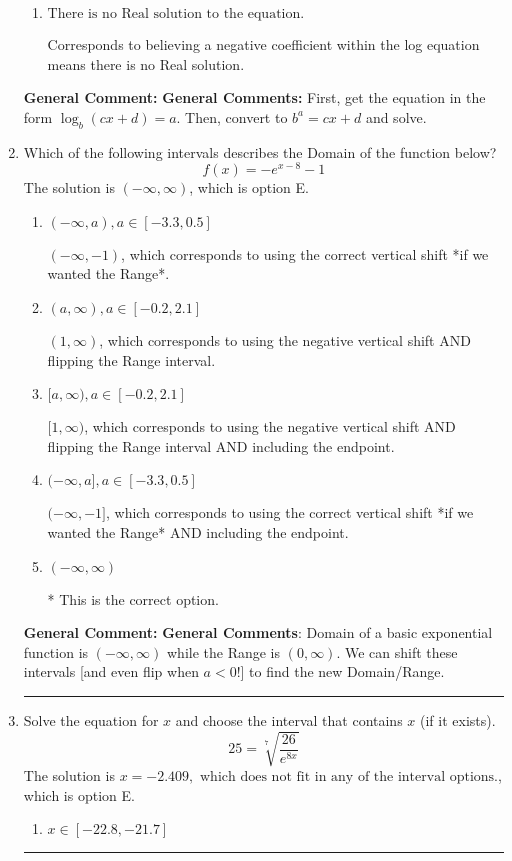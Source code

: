 \documentclass{extbook}[14pt]
\newcommand{\litem}[1]{\item #1

\rule{\textwidth}{0.4pt}}
\begin{document}
\begin{enumerate}
{\begin{enumerate}[label=\Alph*.]
* $x = 1.984$, which is the correct option.
\item \( \text{There is no Real solution to the equation.} \)

Corresponds to believing a negative coefficient within the log equation means there is no Real solution.
\end{enumerate}

\textbf{General Comment:} \textbf{General Comments:} First, get the equation in the form $\log_b{(cx+d)} = a$. Then, convert to $b^a = cx+d$ and solve.
}
\litem{
Which of the following intervals describes the Domain of the function below?
\[ f(x) = -e^{x-8}-1 \]The solution is \( (-\infty, \infty) \), which is option E.\begin{enumerate}[label=\Alph*.]
\item \( (-\infty, a), a \in [-3.3, 0.5] \)

$(-\infty, -1)$, which corresponds to using the correct vertical shift *if we wanted the Range*.
\item \( (a, \infty), a \in [-0.2, 2.1] \)

$(1, \infty)$, which corresponds to using the negative vertical shift AND flipping the Range interval.
\item \( [a, \infty), a \in [-0.2, 2.1] \)

$[1, \infty)$, which corresponds to using the negative vertical shift AND flipping the Range interval AND including the endpoint.
\item \( (-\infty, a], a \in [-3.3, 0.5] \)

$(-\infty, -1]$, which corresponds to using the correct vertical shift *if we wanted the Range* AND including the endpoint.
\item \( (-\infty, \infty) \)

* This is the correct option.
\end{enumerate}

\textbf{General Comment:} \textbf{General Comments}: Domain of a basic exponential function is $(-\infty, \infty)$ while the Range is $(0, \infty)$. We can shift these intervals [and even flip when $a<0$!] to find the new Domain/Range.
}
\litem{
 Solve the equation for $x$ and choose the interval that contains $x$ (if it exists).
\[  25 = \sqrt[7]{\frac{26}{e^{8x}}} \]The solution is \( x = -2.409, \text{ which does not fit in any of the interval options.} \), which is option E.\begin{enumerate}[label=\Alph*.]
\item \( x \in [-22.8, -21.7] \)


\end{enumerate}}
\end{enumerate}
\end{document}
